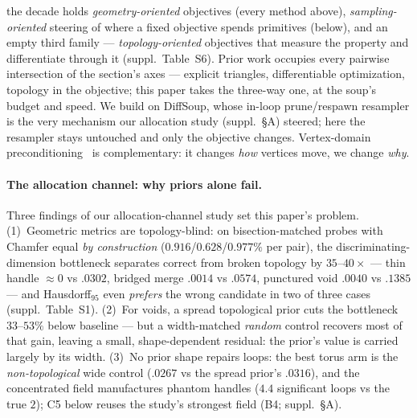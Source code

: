 the decade holds \emph{geometry-oriented} objectives (every method
above), \emph{sampling-oriented} steering of where a fixed objective
spends primitives (below), and an empty third family ---
\emph{topology-oriented} objectives that measure the property and
differentiate through it (suppl.\ Table~S6). Prior work occupies every
pairwise intersection of the section's axes --- explicit triangles,
differentiable optimization, topology in the objective; this paper
takes the three-way one, at the soup's budget and speed.
We build on DiffSoup, whose in-loop
prune/respawn resampler is the very mechanism our allocation study
(suppl.\ \S A) steered; here the resampler stays untouched and only the
objective changes. Vertex-domain preconditioning~\citep{nicolet2021largesteps} is
complementary: it changes \emph{how} vertices move, we change \emph{why}.

\paragraph{The allocation channel: why priors alone fail.}
Three findings of our allocation-channel study set this paper's problem.
(1)~Geometric metrics are topology-blind: on bisection-matched probes with
Chamfer equal \emph{by construction} ($0.916$/$0.628$/$0.977\%$ per
pair), the discriminating-dimension bottleneck separates correct from
broken topology by $35$--$40\times$ --- thin handle ${\approx}0$ vs
$.0302$, bridged merge $.0014$ vs $.0574$, punctured void $.0040$ vs
$.1385$ --- and Hausdorff$_{95}$ even \emph{prefers} the wrong candidate
in two of three cases (suppl.\ Table~S1).
(2)~For voids, a spread topological prior
cuts the bottleneck $33$--$53\%$ below baseline --- but a width-matched
\emph{random} control recovers most of that gain, leaving a small,
shape-dependent residual: the prior's value is carried largely by its
width. (3)~No prior shape repairs loops: the best torus arm is the
\emph{non-topological} wide control ($.0267$ vs the spread prior's
$.0316$), and the concentrated field manufactures phantom handles
($4.4$ significant loops vs the true $2$); C5 below reuses the study's
strongest field (B4; suppl.\ \S A).

